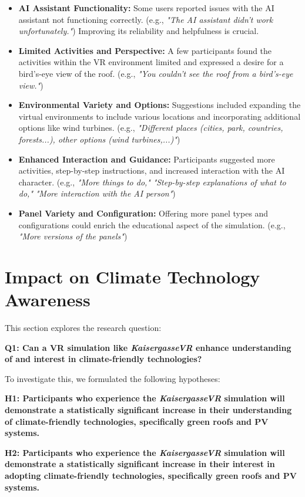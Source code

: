 \documentclass[draft, final]{vutinfth} %
\begin{document}
\begin{itemize}
    \item \textbf{AI Assistant Functionality:} Some users reported issues with the AI assistant not functioning correctly. (e.g., \textit{"The AI assistant didn't work unfortunately."})  Improving its reliability and helpfulness is crucial.
    \item \textbf{Limited Activities and Perspective:}  A few participants found the activities within the VR environment limited and expressed a desire for a bird's-eye view of the roof. (e.g., \textit{"You couldn't see the roof from a bird's-eye view."})
    \item \textbf{Environmental Variety and Options:} Suggestions included expanding the virtual environments to include various locations and incorporating additional options like wind turbines. (e.g., \textit{"Different places (cities, park, countries, forests...), other options (wind turbines,...)"})
    \item \textbf{Enhanced Interaction and Guidance:} Participants suggested more activities, step-by-step instructions, and increased interaction with the AI character. (e.g., \textit{"More things to do,"} \textit{"Step-by-step explanations of what to do,"} \textit{"More interaction with the AI person"})
    \item \textbf{Panel Variety and Configuration:} Offering more panel types and configurations could enrich the educational aspect of the simulation. (e.g., \textit{"More versions of the panels"})
\end{itemize}

\section{Impact on Climate Technology Awareness}

This section explores the research question: 

\textbf{Q1: Can a VR simulation like \textit{KaisergasseVR} enhance understanding of and interest in climate-friendly technologies?}

To investigate this, we formulated the following hypotheses:

\textbf{H1: Participants who experience the \textit{KaisergasseVR} simulation will demonstrate a statistically significant increase in their understanding of climate-friendly technologies, specifically green roofs and PV systems.}

\textbf{H2: Participants who experience the \textit{KaisergasseVR} simulation will demonstrate a statistically significant increase in their interest in adopting climate-friendly technologies, specifically green roofs and PV systems.}
\end{document}
